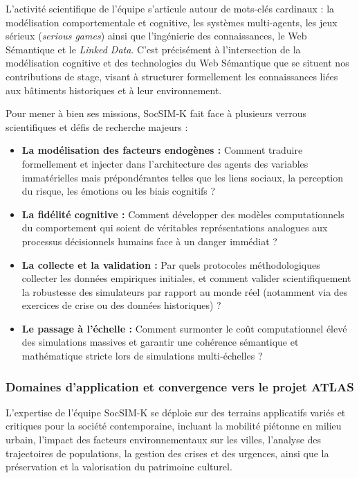 \documentclass{article}
\begin{document}
L'activité scientifique de l'équipe s'articule autour de mots-clés cardinaux : la modélisation comportementale et cognitive, les systèmes multi-agents, les jeux sérieux (\textit{serious games}) ainsi que l'ingénierie des connaissances, le Web Sémantique et le \textit{Linked Data}. C'est précisément à l'intersection de la modélisation cognitive et des technologies du Web Sémantique que se situent nos contributions de stage, visant à structurer formellement les connaissances liées aux bâtiments historiques et à leur environnement.

Pour mener à bien ses missions, SocSIM-K fait face à plusieurs verrous scientifiques et défis de recherche majeurs :
\begin{itemize}
    \item \textbf{La modélisation des facteurs endogènes :} Comment traduire formellement et injecter dans l'architecture des agents des variables immatérielles mais prépondérantes telles que les liens sociaux, la perception du risque, les émotions ou les biais cognitifs ?
    \item \textbf{La fidélité cognitive :} Comment développer des modèles computationnels du comportement qui soient de véritables représentations analogues aux processus décisionnels humains face à un danger immédiat ?
    \item \textbf{La collecte et la validation :} Par quels protocoles méthodologiques collecter les données empiriques initiales, et comment valider scientifiquement la robustesse des simulateurs par rapport au monde réel (notamment via des exercices de crise ou des données historiques) ?
    \item \textbf{Le passage à l'échelle :} Comment surmonter le coût computationnel élevé des simulations massives et garantir une cohérence sémantique et mathématique stricte lors de simulations multi-échelles ?
\end{itemize}

\subsubsection{Domaines d'application et convergence vers le projet ATLAS}

L'expertise de l'équipe SocSIM-K se déploie sur des terrains applicatifs variés et critiques pour la société contemporaine, incluant la mobilité piétonne en milieu urbain, l'impact des facteurs environnementaux sur les villes, l'analyse des trajectoires de populations, la gestion des crises et des urgences, ainsi que la préservation et la valorisation du patrimoine culturel.
\end{document}
